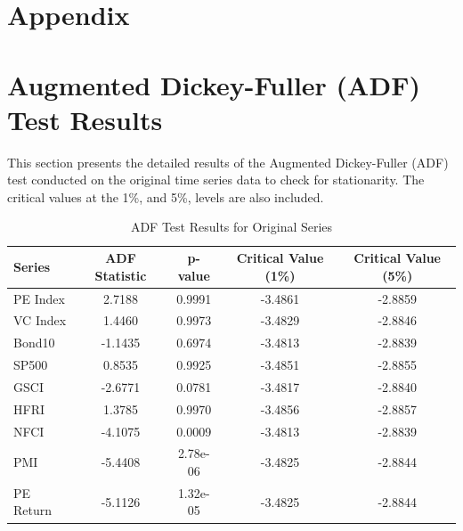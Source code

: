 \documentclass[12pt]{article}
\begin{document}
\newpage

\appendix

\section{Appendix}

\section{Augmented Dickey-Fuller (ADF) Test Results}

This section presents the detailed results of the Augmented Dickey-Fuller (ADF) test conducted on the original time series data to check for stationarity. The critical values at the 1\%, and 5\%, levels are also included.

\begin{table}[h!]
\centering
\caption{ADF Test Results for Original Series}
\begin{tabular}{|l|c|c|c|c|}
\hline
\textbf{Series} & \textbf{ADF Statistic} & \textbf{p-value} & \textbf{Critical Value (1\%)} & \textbf{Critical Value (5\%)} \\ \hline
PE Index        & 2.7188                 & 0.9991           & -3.4861                      & -2.8859                      \\ \hline
VC Index        & 1.4460                 & 0.9973           & -3.4829                      & -2.8846                      \\ \hline
Bond10          & -1.1435                & 0.6974           & -3.4813                      & -2.8839                      \\ \hline
SP500           & 0.8535                 & 0.9925           & -3.4851                      & -2.8855                      \\ \hline
GSCI            & -2.6771                & 0.0781           & -3.4817                      & -2.8840                      \\ \hline
HFRI            & 1.3785                 & 0.9970           & -3.4856                      & -2.8857                      \\ \hline
NFCI            & -4.1075                & 0.0009           & -3.4813                      & -2.8839                      \\ \hline
PMI             & -5.4408                & 2.78e-06         & -3.4825                      & -2.8844                      \\ \hline
PE Return       & -5.1126                & 1.32e-05         & -3.4825                      & -2.8844                      \\ \hline

\end{tabular}
\end{table}
\end{document}
